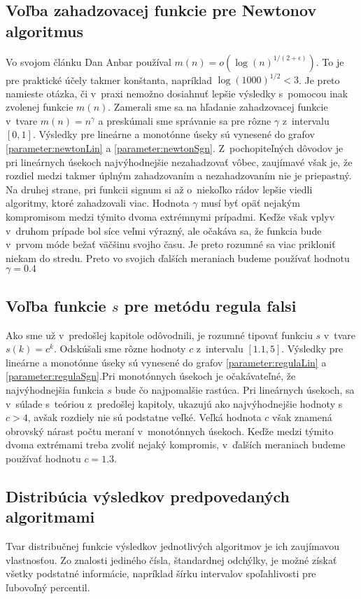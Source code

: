 \subsection{Voľba zahadzovacej funkcie pre Newtonov algoritmus}
Vo svojom článku\cite{anbar} Dan Anbar používal $m(n) =
o(\log(n)^{1/(2+\epsilon)})$. To je pre praktické účely takmer konštanta,
napríklad $\log(1000)^{1/2}<3$. Je preto namieste otázka, či v~praxi nemožno
dosiahnuť lepšie výsledky s~pomocou inak zvolenej funkcie $m(n)$. Zamerali sme
sa na hľadanie zahadzovacej funkcie v~tvare $m(n) = n^\gamma$ a
preskúmali sme správanie sa pre rôzne $\gamma$ z~intervalu $[0, 1]$. Výsledky
pre lineárne a monotónne úseky sú vynesené do grafov \ref{parameter:newtonLin} a
\ref{parameter:newtonSgn}. Z~pochopiteľných dôvodov je pri lineárnych úsekoch
najvýhodnejšie nezahadzovať vôbec, zaujímavé však je, že rozdiel medzi takmer
úplným zahadzovaním a nezahadzovaním nie je priepastný. Na druhej strane, pri
funkcii signum si až o~niekoľko rádov lepšie viedli algoritmy, ktoré zahadzovali
viac. Hodnota $\gamma$ musí byť opäť nejakým kompromisom medzi týmito dvoma
extrémnymi prípadmi. Keďže však vplyv v~druhom prípade bol síce veľmi výrazný,
ale očakáva sa, že funkcia bude v~prvom móde bežať väčšinu svojho času. Je preto
rozumné sa viac prikloniť niekam do stredu. Preto vo svojich ďalších meraniach
budeme používať hodnotu $\gamma=0.4$

\subsection{Voľba funkcie $s$ pre metódu regula falsi}
Ako sme už v~predošlej kapitole odôvodnili, je rozumné tipovať funkciu $s$
v~tvare $s(k)=c^k$. Odskúšali sme rôzne hodnoty $c$ z~intervalu $[1.1, 5]$.
Výsledky pre lineárne a monotónne úseky sú vynesené do grafov
\ref{parameter:regulaLin} a \ref{parameter:regulaSgn}.Pri monotónnych
úsekoch je očakávateľné, že najvýhodnejšia funkcia $s$ bude čo najpomalšie
rastúca. Pri lineárnych úsekoch, sa v~súlade s~teóriou z~predošlej kapitoly,
ukazujú ako najvýhodnejšie hodnoty s~$c>4$, avšak rozdiely nie sú podstatne
veľké. Veľká hodnota $c$ však znamená obrovský nárast počtu meraní v~monotónnych
úsekoch. Keďže medzi týmito dvoma extrémami treba
zvoliť nejaký kompromis, v~ďalších meraniach budeme používať hodnotu $c=1.3$.

\subsection{Distribúcia výsledkov predpovedaných algoritmami}
Tvar distribučnej funkcie výsledkov jednotlivých algoritmov je ich zaujímavou
vlastnosťou. Zo znalosti jediného čísla, štandardnej odchýlky, je možné získať
všetky podstatné informácie, napríklad šírku intervalov spoľahlivosti pre
ľubovoľný percentil.

